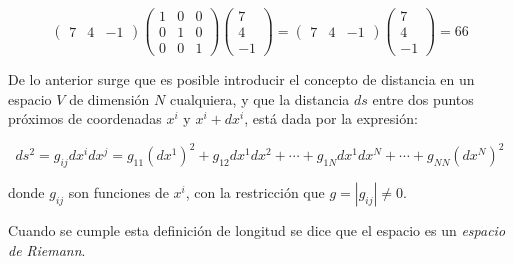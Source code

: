   \begin{equation}
\left(\begin{array}{ccc} 7 & 4 & -1 
\end{array}
 \right) \left(\begin{array}{ccc} 1  & 0  & 0   \\ 0 & 1  & 0 \\ 0   & 0 & 1
\end{array}
 \right)  \left(\begin{array}{c} 7 \\4 \\-1
\end{array}
 \right)=  \left(\begin{array}{ccc} 7 & 4 & -1
\end{array}
 \right)\left(\begin{array}{c} 7 \\4  \\-1
\end{array}
 \right)=66   \label{tensormej2}
\end{equation}


\bigskip

De lo anterior surge que es posible  introducir  el concepto de distancia en un espacio $V$ de dimensión $N$ cualquiera, y que la distancia $ds$ entre dos puntos próximos de coordenadas $x^i$ y $x^i +dx^i$, está dada por la expresión:


\begin{equation}
\label{tmg}
ds^{2}=g_{ij}dx^{i}dx^{j}= g_{11}(dx^{1})^{2}+g_{12}dx^{1} dx^{2}+    \cdots + g_{1N}dx^{1}dx^{N} + \cdots +g_{NN}(dx^{N})^{2}
\end{equation}

\noindent 
donde  $g_{ij}$ son funciones de $x^i$, con la restricción que $g=\left | g_{ij} \right |\neq 0$. 

Cuando se cumple esta definición de longitud se dice que el espacio es un \textit{espacio de Riemann}. 


